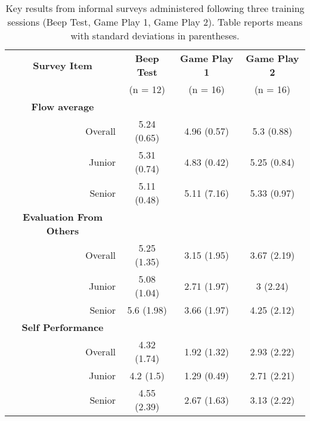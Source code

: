 \begin{table}[]
\begin{tabular}{rccc}
\toprule
\multicolumn{1}{c}{\textbf{Survey Item}}            & \textbf{Beep Test}   & \textbf{Game Play 1} & \textbf{Game Play 2} \\
\multicolumn{1}{c}{}                                & (n = 12)             & (n = 16)             & (n = 16)             \\
\midrule
\multicolumn{1}{c}{\textbf{Flow average}}           & \multicolumn{1}{l}{} & \multicolumn{1}{l}{} & \multicolumn{1}{l}{} \\
Overall                                             & 5.24 (0.65)          & 4.96 (0.57)          & 5.3 (0.88)           \\
Junior                                              & 5.31 (0.74)          & 4.83 (0.42)          & 5.25 (0.84)          \\
Senior                                              & 5.11 (0.48)          & 5.11 (7.16)          & 5.33 (0.97)          \\
\multicolumn{1}{c}{\textbf{Evaluation From Others}} &                      &                      &                      \\
Overall                                             & 5.25 (1.35)          & 3.15 (1.95)          & 3.67 (2.19)          \\
Junior                                              & 5.08 (1.04)          & 2.71 (1.97)          & 3 (2.24)             \\
Senior                                              & 5.6 (1.98)           & 3.66 (1.97)          & 4.25 (2.12)          \\
\multicolumn{1}{c}{\textbf{Self Performance}}       &                      &                      &                      \\
Overall                                             & 4.32 (1.74)          & 1.92 (1.32)          & 2.93 (2.22)          \\
Junior                                              & 4.2 (1.5)            & 1.29 (0.49)          & 2.71 (2.21)          \\
Senior                                              & 4.55 (2.39)          & 2.67 (1.63)          & 3.13 (2.22)         \\
\bottomrule
\end{tabular}
\caption[Post Training Survey Results]{Key results from informal surveys administered following three training sessions (Beep Test, Game Play 1, Game Play 2). Table reports means with standard deviations in parentheses.}
\label{tab:postTrainingTable}
\end{table}